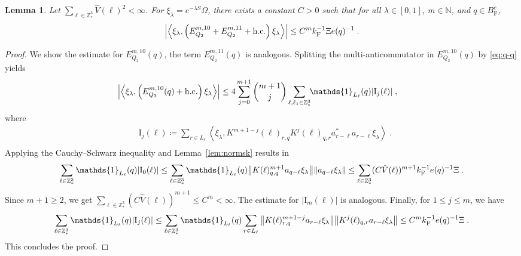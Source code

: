 \documentclass[12pt,a4paper]{article}
\numberwithin{equation}{section}
\newcommand{\NNN}{\mathbb{N}}
\newcommand{\1}{\mathbb{I}}
\newcommand{\F}{\mathrm{F}}
\newcommand{\I}{\mathrm{I}}
\newcommand{\Z}{\mathbb{Z}}
\newcommand{\eva}[1]{\left\langle #1 \right\rangle}
\theoremstyle{plain}
\newtheorem{lemma}[theorem]{Lemma}
\theoremstyle{definition}
\theoremstyle{remark}
\theoremstyle{plain}
\theoremstyle{definition}
\theoremstyle{remark}
\begin{document}
\begin{lemma} \label{lem:EQ212}
Let $ \sum_{\ell \in \Z^3_*} \hat{V}(\ell)^2 < \infty $. For $\xi_\lambda = e^{-\lambda S} \Omega$, there exists a constant $ C > 0 $ such that for all $ \lambda \in [0,1] $, $ m \in \NNN $, and $ q \in B_{\F}^c $,
\begin{equation}
	\abs{\eva{\xi_\lambda,\left(E^{m,10}_{Q_2}+E^{m,11}_{Q_2}+\mathrm{h.c.}\right) \xi_\lambda }}
	\leq C^m k_{\F}^{-1} \Xi e(q)^{-1} \;. \label{eq:estEQ212}
\end{equation}
\end{lemma}

\begin{proof}
We show the estimate for $ E^{m,10}_{Q_2}(q) $, the term $ E^{m,11}_{Q_2}(q) $ is analogous.
Splitting the multi-anticommutator in $ E^{m,10}_{Q_2}(q) $ by \eqref{eq:q-q} yields
\begin{equation} \label{eq:EQ2121}
\begin{aligned}
	& \abs{\eva{\xi_\lambda,\left(E^{m,10}_{Q_2}(q) + \mathrm{h.c.}\right) \xi_\lambda }}
	\le 4 \sum_{j=0}^{m+1} {{m+1}\choose j} \sum_{\ell,\ell_1  \in \Z^3_*}\!\! \mathds{1}_{L_\ell}(q) |\I_j(\ell)| \;,
\end{aligned}
\end{equation}
where
\begin{equation}
\begin{aligned}
	& \I_j(\ell)
	\coloneq \sum_{r\in L_{\ell}}
		\eva{\xi_\lambda, K^{m+1-j}(\ell)_{r,q} K^{j}(\ell)_{q,r} a^*_{r-\ell} a_{r-\ell} \xi_\lambda} \;. \\
\end{aligned}
\end{equation}
Applying the Cauchy--Schwarz inequality and Lemma~\ref{lem:normsk} results in
\begin{equation}
	\sum_{\ell \in \Z^3_*} \mathds{1}_{L_\ell}(q) |\I_0(\ell)|
	\leq \sum_{\ell \in \Z^3_*} \mathds{1}_{L_\ell}(q) \norm{ K(\ell)^{m+1}_{q,q} a_{q-\ell} \xi_\lambda}\norm{ a_{q-\ell} \xi_\lambda }
	\leq \sum_{\ell \in \Z^3_*} (C \hat{V}(\ell))^{m+1}
		k_{\F}^{-1} e(q)^{-1} \Xi \;.\label{eq:estEQ2121}
\end{equation}
Since $ m+1 \ge 2 $, we get $ \sum_{\ell \in \Z^3_*} (C \hat{V}(\ell))^{m+1} \le C^m < \infty $. The estimate for $ |\I_m(\ell)| $ is analogous. Finally, for $ 1 \le j \le m $, we have
\begin{equation}
	\sum_{\ell \in \Z^3_*} \mathds{1}_{L_\ell}(q) |\I_j(\ell)|
	\leq \sum_{\ell \in \Z^3_*} \mathds{1}_{L_\ell}(q)
		\sum\limits_{r \in L_{\ell}}
		\norm{ K(\ell)^{m+1-j}_{r,q} a_{r-\ell}\xi_\lambda}
		\norm{ K^j(\ell)_{q,r} a_{r-\ell} \xi_\lambda }
	\leq C^m k_{\F}^{-1} e(q)^{-1} \Xi \;. \label{eq:estEQ2122}
\end{equation}
This concludes the proof.
\end{proof}
\end{document}
